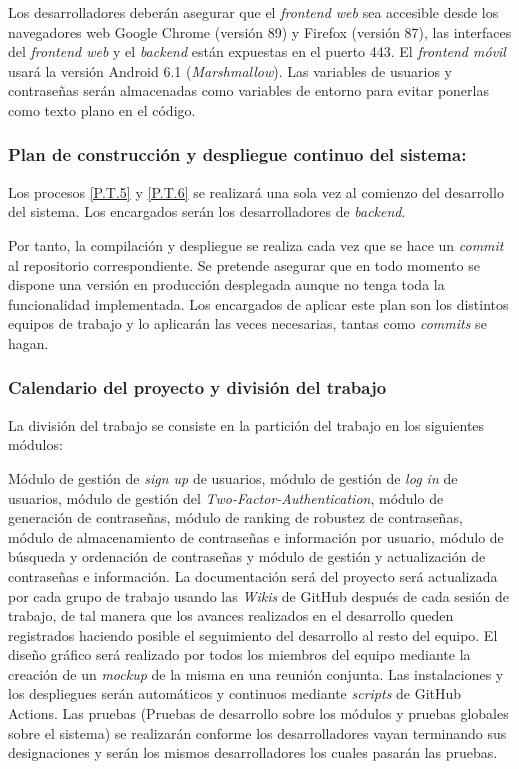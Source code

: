 \documentclass{article}
\begin{document}
Los desarrolladores deberán asegurar que el \textit{frontend web} sea accesible desde los navegadores web Google Chrome (versión 89) y Firefox (versión 87), las interfaces del \textit{frontend web} y el \textit{backend} están expuestas en el puerto 443. El \textit{frontend móvil} usará la versión Android 6.1 (\textit{Marshmallow}). Las variables de usuarios y contraseñas serán almacenadas como variables de entorno para evitar ponerlas como texto plano en el código.


\subsubsection{Plan de construcción y despliegue continuo del sistema: } \label{PL.T.3}
Los procesos \ref{P.T.5} y \ref{P.T.6} se realizará una sola vez al comienzo del desarrollo del sistema. Los encargados serán los desarrolladores de \textit{backend}. 

Por tanto, la compilación y despliegue se realiza cada vez que se hace un \textit{commit} al repositorio correspondiente. Se pretende asegurar que en todo momento se dispone una versión en producción desplegada aunque no tenga toda la funcionalidad implementada. Los encargados de aplicar este plan son los distintos equipos de trabajo y lo aplicarán las veces necesarias, tantas como \textit{commits} se hagan.

\subsubsection{Calendario del proyecto y división del trabajo} \label{GANTT}

La división del trabajo se consiste en la partición del trabajo en los siguientes módulos:

Módulo de gestión de \textit{sign up} de usuarios, módulo de gestión de \textit{log in} de usuarios, módulo de gestión del \textit{Two-Factor-Authentication}, módulo de generación de contraseñas, módulo de ranking de robustez de contraseñas, módulo de almacenamiento de contraseñas e información por usuario, módulo de búsqueda y ordenación de contraseñas y módulo de gestión y actualización de contraseñas e información. La documentación será del proyecto será actualizada por cada grupo de trabajo usando las \textit{Wikis} de GitHub después de cada sesión de trabajo, de tal manera que los avances realizados en el desarrollo queden registrados haciendo posible el seguimiento del desarrollo al resto del equipo. El diseño gráfico será realizado por todos los miembros del equipo mediante la creación de un \textit{mockup} de la misma en una reunión conjunta. Las instalaciones y los despliegues serán automáticos y continuos mediante \textit{scripts} de GitHub Actions. Las pruebas (Pruebas de desarrollo sobre los módulos y pruebas globales sobre el sistema) se realizarán conforme los desarrolladores vayan terminando sus designaciones y serán los mismos desarrolladores los cuales pasarán las pruebas.
\end{document}

